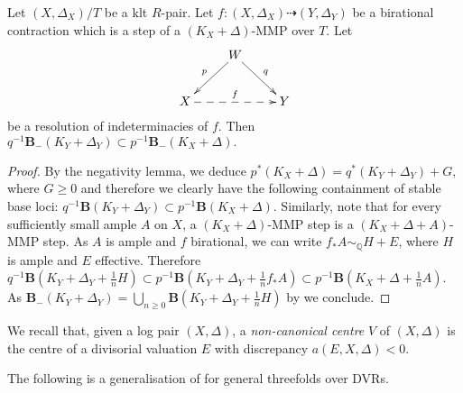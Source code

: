 \documentclass[a4paper,12pt]{book}
\begin{document}
	\begin{lemma}\label{l-stable-base-loci}
		Let $(X,\Delta_X)/T$ be a klt $R$-pair.
		Let $f\colon (X, \Delta_X) \dashrightarrow (Y, \Delta_Y)$ be a birational contraction which is a step of a  $(K_X+\Delta)$-MMP over $T$.
		Let
		\begin{equation*}
			\xymatrix{
				& W \ar[dr]^q \ar[dl]_p & \\
				X \ar@{-->}[rr]^{f} & & Y}
		\end{equation*} 
		be a resolution of indeterminacies of $f$.
		Then $q^{-1}\mathbf{B}_{-}(K_Y+\Delta_Y) \subset p^{-1}\mathbf{B}_{-}(K_X+\Delta).$
	\end{lemma}
	
	\begin{proof}
		By the negativity lemma, we deduce $p^*(K_X+\Delta)=q^*(K_Y+\Delta_Y)+G,$ where $G \geq 0$ and therefore we clearly have the following containment of stable base loci: $q^{-1}\mathbf{B}(K_Y+\Delta_Y) \subset p^{-1}\mathbf{B}(K_X+\Delta).$
		Similarly, note that for every sufficiently small ample $A$ on $X$,
		a $(K_X+\Delta)$-MMP step is a $(K_X+\Delta+A)$-MMP step. As $A$ is ample and $f$ birational, we can write $f_*A \sim_{\mathbb{Q}} H+E$, where $H$ is ample and $E$ effective. 
		Therefore  $q^{-1}\mathbf{B}(K_Y+\Delta_Y+\frac{1}{n}H) \subset p^{-1}\mathbf{B}(K_Y+\Delta_Y+ \frac{1}{n}f_*A)\subset  p^{-1}\mathbf{B}(K_X+\Delta+ \frac{1}{n}A) $.
		As $\mathbf{B}_{-}(K_Y+\Delta_Y)=\bigcup_{n \geq 0} \mathbf{B}(K_Y+\Delta_Y+\frac{1}{n}H)$ by \cite[Proposition 1.19]{asympt-baseloci} we conclude.
	\end{proof}

	We recall that, given a log pair $(X,\Delta)$, a \emph{non-canonical centre} $V$ of $(X,\Delta)$ is the centre of a divisorial valuation $E$ with discrepancy $a(E, X, \Delta)<0$.  

The following is a generalisation of \cite[Lemma 3.1]{HMX18} for general threefolds over DVRs. 
	
\end{document}
